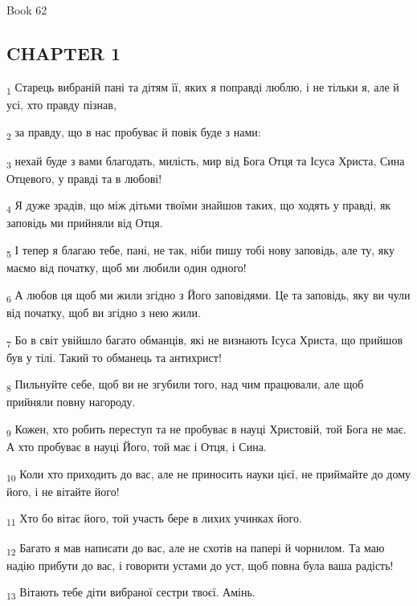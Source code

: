 Book 62
\subsection{CHAPTER 1}
\begin{tcolorbox}
\textsubscript{1} Старець вибраній пані та дітям її, яких я поправді люблю, і не тільки я, але й усі, хто правду пізнав,
\end{tcolorbox}
\begin{tcolorbox}
\textsubscript{2} за правду, що в нас пробуває й повік буде з нами:
\end{tcolorbox}
\begin{tcolorbox}
\textsubscript{3} нехай буде з вами благодать, милість, мир від Бога Отця та Ісуса Христа, Сина Отцевого, у правді та в любові!
\end{tcolorbox}
\begin{tcolorbox}
\textsubscript{4} Я дуже зрадів, що між дітьми твоїми знайшов таких, що ходять у правді, як заповідь ми прийняли від Отця.
\end{tcolorbox}
\begin{tcolorbox}
\textsubscript{5} І тепер я благаю тебе, пані, не так, ніби пишу тобі нову заповідь, але ту, яку маємо від початку, щоб ми любили один одного!
\end{tcolorbox}
\begin{tcolorbox}
\textsubscript{6} А любов ця щоб ми жили згідно з Його заповідями. Це та заповідь, яку ви чули від початку, щоб ви згідно з нею жили.
\end{tcolorbox}
\begin{tcolorbox}
\textsubscript{7} Бо в світ увійшло багато обманців, які не визнають Ісуса Христа, що прийшов був у тілі. Такий то обманець та антихрист!
\end{tcolorbox}
\begin{tcolorbox}
\textsubscript{8} Пильнуйте себе, щоб ви не згубили того, над чим працювали, але щоб прийняли повну нагороду.
\end{tcolorbox}
\begin{tcolorbox}
\textsubscript{9} Кожен, хто робить переступ та не пробуває в науці Христовій, той Бога не має. А хто пробуває в науці Його, той має і Отця, і Сина.
\end{tcolorbox}
\begin{tcolorbox}
\textsubscript{10} Коли хто приходить до вас, але не приносить науки цієї, не приймайте до дому його, і не вітайте його!
\end{tcolorbox}
\begin{tcolorbox}
\textsubscript{11} Хто бо вітає його, той участь бере в лихих учинках його.
\end{tcolorbox}
\begin{tcolorbox}
\textsubscript{12} Багато я мав написати до вас, але не схотів на папері й чорнилом. Та маю надію прибути до вас, і говорити устами до уст, щоб повна була ваша радість!
\end{tcolorbox}
\begin{tcolorbox}
\textsubscript{13} Вітають тебе діти вибраної сестри твоєї. Амінь.
\end{tcolorbox}
